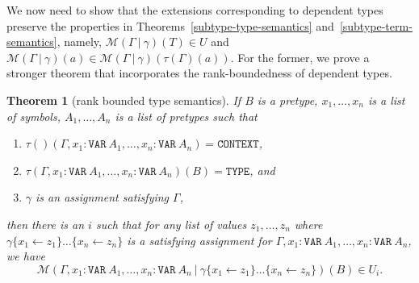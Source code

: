 \documentclass [12pt,twoside]{cslreport}
\newcommand{\tauGamma}[1]{\tau(\Gamma)(#1)}
\newcommand{\Mgamma}[1]{{\mathcal M}(\Gamma\vbar\gamma)(#1)}
\newcommand{\tttype}{\mathtt{TYPE}}
\newcommand{\ttcontext}{\mathtt{CONTEXT}}
\newcommand{\ttvar}{\mathtt{VAR}}
\newcommand{\vbar}{\ |\ }
\newtheorem{theorem}{Theorem}
\begin{document}
We now need to show that the extensions corresponding to dependent types
preserve the properties in Theorems~\ref{subtype-type-semantics}
and~\ref{subtype-term-semantics}, namely, 
$\Mgamma{T} \in U$ and $\Mgamma{a}\in \Mgamma{\tauGamma{a}}$\@.
For the former, we prove a stronger theorem that incorporates the
rank-boundedness of dependent types.
\begin{theorem}[rank bounded type semantics]\label{dependent-type-semantics}
If $B$ is a pretype, $x_1,\ldots, x_n$ is a list of symbols,
$A_1,\ldots, A_n$ is a list of pretypes such that  
\begin{enumerate}
\item $\tau()(\Gamma, x_1:\ttvar~A_1, \ldots, x_n:\ttvar~A_n) = \ttcontext$,
\item $\tau(\Gamma, x_1:\ttvar~A_1, \ldots, x_n:\ttvar~A_n)(B) = \tttype$,
and
\item $\gamma$ is an assignment satisfying $\Gamma$,
\end{enumerate}
then
there is an $i$ such that for any list of values
$z_1,\ldots, z_n$ where $\gamma\{x_1\gets
z_1\}\ldots\{x_n\gets z_n\}$ is a satisfying assignment for
$\Gamma, x_1:\ttvar~A_1, \ldots, x_n:\ttvar~A_n$,  we have
$$\mathcal{M}(\Gamma, x_1:\ttvar~A_1, \ldots, x_n:\ttvar~A_n\vbar
\gamma\{x_1\gets z_1\}\ldots\{x_n\gets z_n\})(B) \in U_i.$$
\end{theorem}
\end{document}
